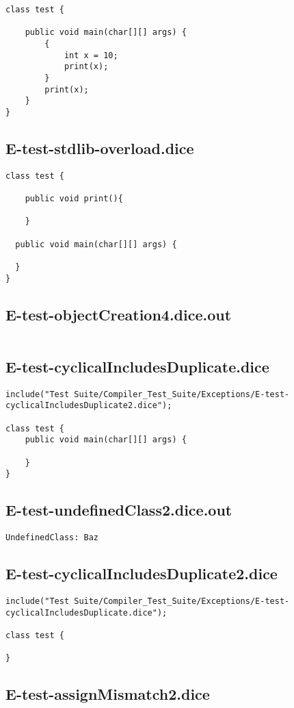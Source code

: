 \begin{verbatim}
class test {

	public void main(char[][] args) {
		{
			int x = 10;
			print(x);
		}
		print(x);
	}
}
\end{verbatim}\pagebreak\subsection{E-test-stdlib-overload.dice}
\begin{verbatim}
class test {

	public void print(){

	}

  public void main(char[][] args) {
     
  }
}
\end{verbatim}\pagebreak\subsection{E-test-objectCreation4.dice.out}
\begin{verbatim}

\end{verbatim}\pagebreak\subsection{E-test-cyclicalIncludesDuplicate.dice}
\begin{verbatim}
include("Test Suite/Compiler_Test_Suite/Exceptions/E-test-cyclicalIncludesDuplicate2.dice");

class test {
	public void main(char[][] args) {
        
	}
}

\end{verbatim}\pagebreak\subsection{E-test-undefinedClass2.dice.out}
\begin{verbatim}
UndefinedClass: Baz

\end{verbatim}\pagebreak\subsection{E-test-cyclicalIncludesDuplicate2.dice}
\begin{verbatim}
include("Test Suite/Compiler_Test_Suite/Exceptions/E-test-cyclicalIncludesDuplicate.dice");

class test {
	
}

\end{verbatim}\pagebreak\subsection{E-test-assignMismatch2.dice}
